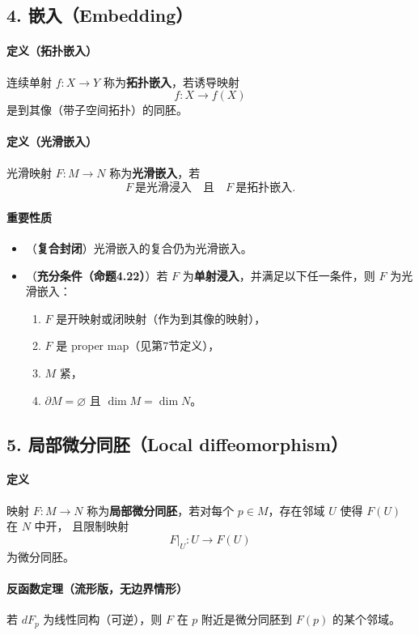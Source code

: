 \documentclass[12pt]{article}
\begin{document}
\subsection*{4. 嵌入（Embedding）}
\paragraph{定义（拓扑嵌入）}
连续单射 $f:X\to Y$ 称为\textbf{拓扑嵌入}，若诱导映射
\[
f:X\to f(X)
\]
是到其像（带子空间拓扑）的同胚。

\paragraph{定义（光滑嵌入）}
光滑映射 $F:M\to N$ 称为\textbf{光滑嵌入}，若
\[
F\ \text{是光滑浸入}\quad\text{且}\quad F\ \text{是拓扑嵌入}.
\]

\paragraph{重要性质}
\begin{itemize}
\item （\textbf{复合封闭}）光滑嵌入的复合仍为光滑嵌入。
\item （\textbf{充分条件（命题4.22）}）若 $F$ 为\textbf{单射浸入}，并满足以下任一条件，则 $F$ 为光滑嵌入：
\begin{enumerate}
\item $F$ 是开映射或闭映射（作为到其像的映射），
\item $F$ 是 proper map（见第7节定义），
\item $M$ 紧，
\item $\partial M=\varnothing$ 且 $\dim M=\dim N$。
\end{enumerate}
\end{itemize}

\subsection*{5. 局部微分同胚（Local diffeomorphism）}
\paragraph{定义}
映射 $F:M\to N$ 称为\textbf{局部微分同胚}，若对每个 $p\in M$，存在邻域 $U$ 使得 $F(U)$ 在 $N$ 中开，
且限制映射
\[
F|_U:U\to F(U)
\]
为微分同胚。

\paragraph{反函数定理（流形版，无边界情形）}
若 $dF_p$ 为线性同构（可逆），则 $F$ 在 $p$ 附近是微分同胚到 $F(p)$ 的某个邻域。
\end{document}
